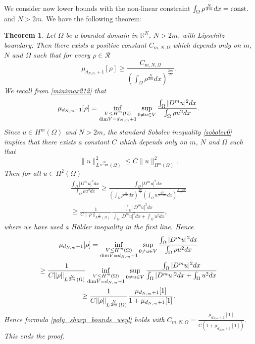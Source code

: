 \documentclass[11pt,a4paper]{amsart}
\numberwithin{equation}{section}
\newtheorem{thm}[equation]{Theorem}
\begin{document}
We consider now lower bounds with the non-linear constraint $\int_{\Omega}\rho^{\frac{N}{2m}}dx={\rm const.}$ and $N>2m$. We have the following theorem:

\begin{thm}\label{lowerbound_weyl}
Let $\Omega$ be a bounded domain in $\mathbb R^N$, $N>2m$, with Lipschitz boundary. Then there exists a positive constant $C_{m,N,\Omega}$ which depends only on $m$, $N$ and $\Omega$ such that for every $\rho\in\mathcal R$
\begin{equation}\label{poly_sharp_bounds_weyl}
\mu_{d_{N,m}+1}[\rho]\geq \frac{C_{m,N,\Omega}}{\left(\int_{\Omega}\rho^{\frac{N}{2m}} dx\right)^{\frac{2m}{N}}}.
\end{equation}
\proof
We recall from \eqref{minimax212} that
$$
\mu_{d_{N,m}+1}[\rho]=\inf_{\substack{V\leq H^m(\Omega)\\{\rm dim}V=d_{N,m}+1}}\sup_{\substack{0\ne u\in V}}\frac{\int_{\Omega}|D^mu|^2dx}{\int_{\Omega}\rho u^2dx}.
$$
Since $u\in H^m(\Omega)$ and $N>2m$, the standard Sobolev inequality \eqref{sobolev0} implies that there exists a constant $C$ which depends only on $m$, $N$ and $\Omega$ such that
$$
\|u\|_{L^{\frac{2N}{N-2m}}(\Omega)}^2\leq C\|u\|_{H^m(\Omega)}^2.
$$
Then for all $u\in H^2(\Omega)$
\begin{multline*}
\frac{\int_{\Omega}|D^mu|^2dx}{\int_{\Omega}\rho u^2dx}\geq\frac{\int_{\Omega}|D^m u|^2dx}{\left(\int_{\Omega}\rho^{\frac{N}{2m}}dx\right)^{\frac{2m}{N}}\left(\int_{\Omega}u^{\frac{2N}{N-2m}}dx\right)^{\frac{N-2m}{N}}}\\
\geq\frac{1}{C\|\rho\|_{L^{\frac{N}{2m}}(\Omega)}}\frac{\int_{\Omega}|D^m u|^2dx}{\int_{\Omega}|D^m u|^2dx+\int_{\Omega}u^2dx},
\end{multline*}
where we have used a H\"older inequality in the first line. Hence
\begin{multline*}
\mu_{d_{N,m}+1}[\rho]=\inf_{\substack{V\leq H^m(\Omega)\\{\rm dim}V=d_{N,m}+1}}\sup_{\substack{0\ne u\in V}}\frac{\int_{\Omega}|D^mu|^2dx}{\int_{\Omega}\rho u^2dx}\\
\geq \frac{1}{C\|\rho\|_{L^{\frac{N}{2m}}(\Omega)}}\inf_{\substack{V\leq H^m(\Omega)\\{\rm dim}V=d_{N,m}+1}}\sup_{\substack{0\ne u\in V}}\frac{\int_{\Omega}|D^mu|^2dx}{\int_{\Omega}|D^m u|^2dx+\int_{\Omega}u^2dx}\\
\geq\frac{1}{C\|\rho\|_{L^{\frac{N}{2m}}(\Omega)}}\frac{\mu_{d_{N,m}+1}[1]}{1+\mu_{d_{N,m}+1}[1]}.
\end{multline*}
Hence formula \eqref{poly_sharp_bounds_weyl} holds with $C_{m,N,\Omega}=\frac{\mu_{d_{N,m}+1}[1]}{C(1+\mu_{d_{N,m}+1}[1])}$. This ends the proof.
\endproof
\end{thm}
\end{document}
